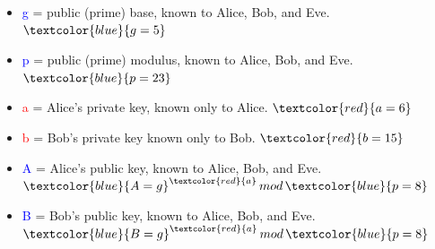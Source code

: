 \begin{itemize}
    \item \textcolor{blue}{g} = public (prime) base, known to Alice, Bob, and Eve. $\textcolor{blue}{g = 5}$
    \item \textcolor{blue}{p} = public (prime) modulus, known to Alice, Bob, and Eve. $\textcolor{blue}{p = 23}$
    \item \textcolor{red}{a} = Alice's private key, known only to Alice. $\textcolor{red}{a = 6}$
    \item \textcolor{red}{b} = Bob's private key known only to Bob. $\textcolor{red}{b = 15}$
    \item \textcolor{blue}{A} = Alice's public key, known to Alice, Bob, and Eve. $\textcolor{blue}{A = g}^{\textcolor{red}{a}} \, mod \, \textcolor{blue}{p = 8}$
    \item \textcolor{blue}{B} = Bob's public key, known to Alice, Bob, and Eve. $\textcolor{blue}{B = g}^{\textcolor{red}{a}} \, mod \, \textcolor{blue}{p = 8}$
\end{itemize}

